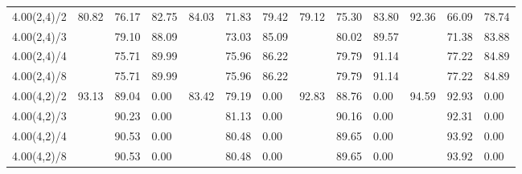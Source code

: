 \documentclass{article}
\theoremstyle{definition}
\theoremstyle{remark}
\begin{document}
\begin{table}[h]
\begin{tabular}{|p{1.45cm}|p{0.65cm}|p{0.65cm}|p{0.65cm}|p{0.65cm}|p{0.65cm}|p{0.65cm}|p{0.65cm}|p{0.65cm}|p{0.65cm}|p{0.65cm}|p{0.65cm}|p{0.65cm}|}
\hline
4.00(2,4)/2    &   \multirow{4}{*}{80.82} & 76.17    &    82.75    &  \multirow{4}{*}{84.03} & 71.83    &    79.42    &   \multirow{4}{*}{79.12}  &75.30    &    83.80    &   \multirow{4}{*}{92.36}  & 66.09    &    78.74    \\
4.00(2,4)/3    &    & 79.10    &    88.09   &  &    73.03    &    85.09    &    & 80.02    &    89.57    &   & 71.38    &    83.88   \\
4.00(2,4)/4    &    & 75.71    &    89.99  &  &    75.96    &    86.22    &    & 79.79    &    91.14    &   &  77.22    &    84.89   \\
4.00(2,4)/8    &    & 75.71    &    89.99   &  &    75.96    &    86.22    &    & 79.79    &    91.14    &  &   77.22    &    84.89    \\ \hline
4.00(4,2)/2    &  \multirow{4}{*}{93.13}  &89.04    &    0.00    &  \multirow{4}{*}{83.42}  & 79.19    &    0.00    &   \multirow{4}{*}{92.83} & 88.76    &    0.00    &   \multirow{4}{*}{94.59}  &92.93    &    0.00       \\
4.00(4,2)/3    &    & 90.23    &    0.00    &    &81.13    &    0.00    &   & 90.16    &    0.00    &    & 92.31    &    0.00       \\
4.00(4,2)/4    &    & 90.53    &    0.00    &    & 80.48    &    0.00    &    & 89.65    &    0.00    &   &  93.92    &    0.00       \\
4.00(4,2)/8    &    & 90.53    &    0.00    &    & 80.48    &    0.00    &  &  89.65    &    0.00    &   & 93.92    &    0.00       \\ \hline
    \end{tabular}
\end{table}
\end{document}
